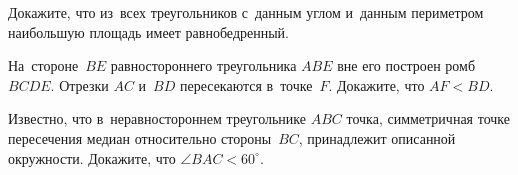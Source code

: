 \begin{problems}
\item
Докажите, что из~всех треугольников с~данным углом и~данным периметром
наибольшую площадь имеет равнобедренный.

\item
На~стороне~$BE$ равностороннего треугольника $ABE$ вне его построен
ромб $BCDE$.
Отрезки $AC$ и~$BD$ пересекаются в~точке~$F$.
Докажите, что $AF < BD$.

\item
Известно, что в~неравностороннем треугольнике $ABC$ точка, симметричная точке
пересечения медиан относительно стороны~$BC$, принадлежит описанной окружности.
Докажите, что $\angle BAC < 60^{\circ}$.

\end{problems}

